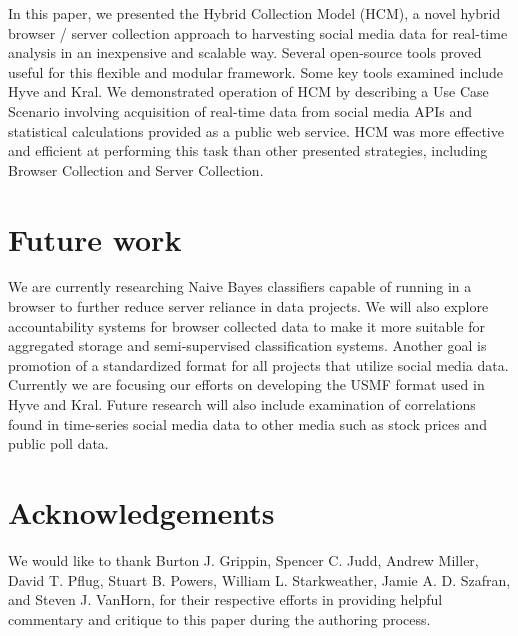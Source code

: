 \documentclass[letterpaper]{article}
\begin{document}
In this paper, we presented the Hybrid Collection Model (HCM), a novel hybrid browser / server collection approach to harvesting social media data for real-time analysis in an inexpensive and scalable way. Several open-source tools proved useful for this flexible and modular framework. Some key tools examined include Hyve and Kral. We demonstrated operation of HCM by describing a Use Case Scenario involving acquisition of real-time data from social media APIs and statistical calculations provided as a public web service. HCM was more effective and efficient at performing this task than other presented strategies, including Browser Collection and Server Collection. 

\section{Future work}

We are currently researching Naive Bayes classifiers capable of running in a browser to further reduce server reliance in data projects. We will also explore accountability systems for browser collected data to make it more suitable for aggregated storage and semi-supervised classification systems. Another goal is promotion of a standardized format for all projects that utilize social media data. Currently we are focusing our efforts on developing the USMF format used in Hyve and Kral. Future research will also include examination of correlations found in time-series social media data to other media such as stock prices and public poll data.

\section{Acknowledgements}

We would like to thank Burton J. Grippin, Spencer C. Judd, Andrew Miller, David T. Pflug, Stuart B. Powers, William L. Starkweather, Jamie A. D. Szafran, and Steven J. VanHorn, for their respective efforts in providing helpful commentary and critique to this paper during the authoring process.




\end{document}
